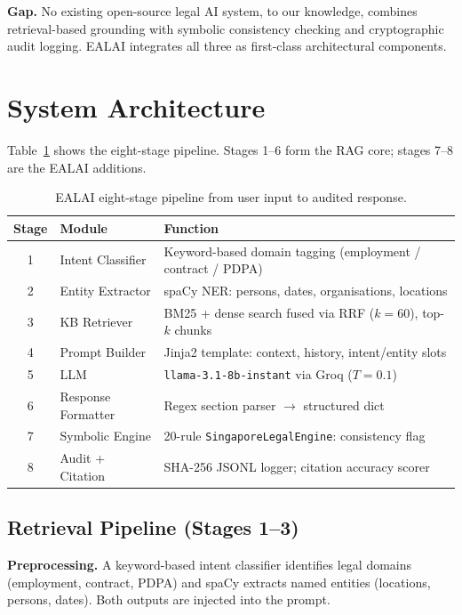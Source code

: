 \documentclass[runningheads]{llncs}
\let\oldsection\section
\renewcommand{\section}{\clearpage\oldsection}
\begin{document}
\textbf{Gap.}
No existing open-source legal AI system, to our knowledge, combines retrieval-based
grounding with symbolic consistency checking and cryptographic audit logging. EALAI
integrates all three as first-class architectural components.

\section{System Architecture}

Table~\ref{tab:arch} shows the eight-stage pipeline. Stages 1--6 form the RAG core;
stages 7--8 are the EALAI additions.

\begin{table}[H]
\centering
\caption{EALAI eight-stage pipeline from user input to audited response.}
\label{tab:arch}
\small
\begin{tabular}{clp{7.5cm}}
\toprule
\textbf{Stage} & \textbf{Module} & \textbf{Function} \\
\midrule
1 & Intent Classifier    & Keyword-based domain tagging (employment / contract / PDPA) \\
2 & Entity Extractor     & spaCy NER: persons, dates, organisations, locations \\
3 & KB Retriever         & BM25 + dense search fused via RRF ($k=60$), top-$k$ chunks \\
4 & Prompt Builder       & Jinja2 template: context, history, intent/entity slots \\
5 & LLM                  & \texttt{llama-3.1-8b-instant} via Groq ($T=0.1$) \\
6 & Response Formatter   & Regex section parser $\rightarrow$ structured dict \\
\midrule
7 & Symbolic Engine      & 20-rule \texttt{SingaporeLegalEngine}: consistency flag \\
8 & Audit + Citation     & SHA-256 JSONL logger; citation accuracy scorer \\
\bottomrule
\end{tabular}
\end{table}

\subsection{Retrieval Pipeline (Stages 1--3)}

\textbf{Preprocessing.} A keyword-based intent classifier identifies legal domains
(employment, contract, PDPA) and spaCy extracts named entities (locations, persons,
dates). Both outputs are injected into the prompt.
\end{document}
